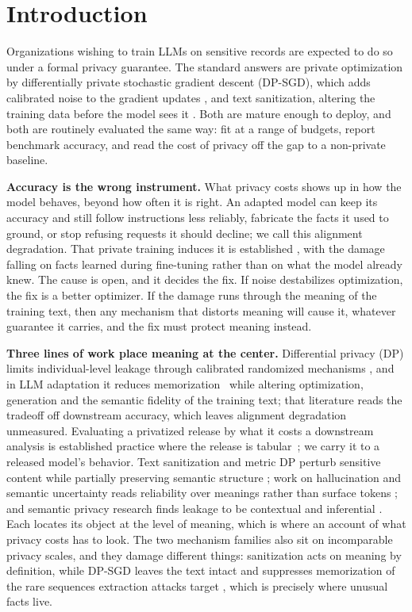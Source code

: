 \section{\label{sec:intro}Introduction}
Organizations wishing to train LLMs on sensitive records are expected to do so under a formal privacy guarantee.
The standard answers are private optimization by differentially private stochastic gradient descent (DP-SGD),
which adds calibrated noise to the gradient updates \citep{abadi2016deep, mironov2017renyi},
and text sanitization,
altering the training data before the model sees it \citep{feyisetan2020privacy, yue2021differential, carvalho2021tem}.
Both are mature enough to deploy,
and both are routinely evaluated the same way:
fit at a range of budgets,
report benchmark accuracy,
and read the cost of privacy off the gap to a non-private baseline.

\textbf{Accuracy is the wrong instrument.}
What privacy costs shows up in how the model behaves,
beyond how often it is right.
An adapted model can keep its accuracy and still follow instructions less reliably,
fabricate the facts it used to ground,
or stop refusing requests it should decline;
we call this alignment degradation.
That private training induces it is established \citep{ramesh2026privacyhallucination},
with the damage falling on facts learned during fine-tuning rather than on what the model already knew.
The cause is open,
and it decides the fix.
If noise destabilizes optimization,
the fix is a better optimizer.
If the damage runs through the meaning of the training text,
then any mechanism that distorts meaning will cause it,
whatever guarantee it carries,
and the fix must protect meaning instead.

\textbf{Three lines of work place meaning at the center.}
Differential privacy (DP) limits individual-level leakage through calibrated randomized mechanisms \citep{dwork2006calibrating, dwork2014algorithmic},
and in LLM adaptation it reduces memorization~\citep{abadi2016deep, carlini2021extracting} while altering optimization,
generation and the semantic fidelity of the training text;
that literature reads the tradeoff off downstream accuracy,
which leaves alignment degradation unmeasured.
Evaluating a privatized release by what it costs a downstream analysis is established practice where the release is tabular~\citep{bowen2020comparative, liu2023covid};
we carry it to a released model's behavior.
Text sanitization and metric DP perturb sensitive content while partially preserving semantic structure \citep{chatzikokolakis2013broadening, feyisetan2020privacy, yue2021differential};
work on hallucination and semantic uncertainty reads reliability over meanings rather than surface tokens \citep{farquhar2024detecting};
and semantic privacy research finds leakage to be contextual and inferential \citep{ma2025sok}.
Each locates its object at the level of meaning,
which is where an account of what privacy costs has to look.
The two mechanism families also sit on incomparable privacy scales,
and they damage different things:
sanitization acts on meaning by definition,
while DP-SGD leaves the text intact and suppresses memorization of the rare sequences extraction attacks target \citep{carlini2021extracting},
which is precisely where unusual facts live.


